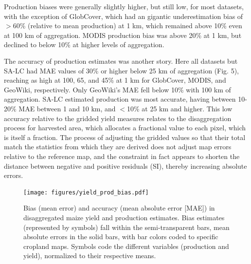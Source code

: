 \documentclass{pnastwo}
\begin{document}
\begin{article}
Production biases were generally slightly higher, but still low, for most datasets, with the exception of GlobCover, which had an gigantic underestimation bias of $>$60\% (relative to mean production) at 1 km, which remained above 10\% even at 100 km of aggregation. MODIS production bias was above 20\% at 1 km, but declined to below 10\% at higher levels of aggregation.  

The accuracy of production estimates was another story. Here all datasets but SA-LC had MAE values of 30\% or higher below 25 km of aggregation (Fig. 5), reaching as high at 100, 65, and 45\% at 1 km for GlobCover, MODIS, and GeoWiki, respectively. Only GeoWiki's MAE fell below 10\% with 100 km of aggregation.  SA-LC estimated production was most accurate, having between 10-20\% MAE between 1 and 10 km, and $<$10\% at 25 km and higher.  This low accuracy relative to the gridded yield measures relates to the disaggregation process for harvested area, which allocates a fractional value to each pixel, which is itself a fraction.  The process of adjusting the gridded values so that their total match the statistics from which they are derived does not adjust map errors relative to the reference map, and the constraint in fact appears to shorten the distance between negative and positive residuals (SI), thereby increasing absolute errors.  


\begin{figure}[!h]
\vspace{-0.75 cm}
\centerline{\texttt{[image: figures/yield\_prod\_bias.pdf]}}
\caption{Bias (mean error) and accuracy (mean absolute error [MAE]) in disaggregated maize yield and production estimates. Bias estimates (represented by symbols) fall within the semi-transparent bars, mean absolute errors in the solid bars, with bar colors coded to specific cropland maps.  Symbols code the different variables (production and yield), normalized to their respective means.}
\label{afoto}
\end{figure}


\end{article}
\end{document}
